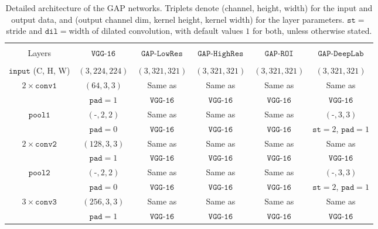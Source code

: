 \documentclass[british,10pt,twocolumn,letterpaper]{article}
\providecommand{\tabularnewline}{\\}
\begin{document}
\newpage





\begin{table*}
\caption{\label{tab:GAP-networks}Detailed architecture of the GAP networks.
Triplets denote (channel, height, width) for the input and output
data, and (output channel dim, kernel height, kernel width) for the
layer parameters. $\mathtt{st}=$stride and $\mathtt{dil}=$width
of dilated convolution, with default values $1$ for both, unless
otherwise stated.}

\begin{centering}
\begin{tabular}{cccccc}
 &  &  &  &  & \tabularnewline
Layers & $\mathtt{VGG}\text{-}\mathtt{16}$ & $\mathtt{GAP}\text{-}\mathtt{LowRes}$ &  $\mathtt{GAP}\text{-}\mathtt{HighRes}$ &  $\mathtt{GAP}\text{-}\mathtt{ROI}$ &  $\mathtt{GAP}\text{-}\mathtt{DeepLab}$\tabularnewline
 & \cite{Simonyan2015Iclr} &  \cite{zhou2015cnnlocalization} & \cite{kolesnikov2016seed} &  & \cite{Chen2016ArxivDeeplabv2}\tabularnewline
\hline 
$\mathtt{input}$ (C, H, W) & $(3,224,224)$ & $(3,321,321)$ & $(3,321,321)$ & $(3,321,321)$ & $(3,321,321)$\tabularnewline
\hline 
$2\times\mathtt{conv1}$ & $(64,3,3)$ & Same as & Same as & Same as & Same as\tabularnewline
 & $\mathtt{pad}=1$ & $\mathtt{VGG}\text{-}\mathtt{16}$ & $\mathtt{VGG}\text{-}\mathtt{16}$ & $\mathtt{VGG}\text{-}\mathtt{16}$ & $\mathtt{VGG}\text{-}\mathtt{16}$\tabularnewline
\hline 
$\mathtt{pool1}$ & $(\text{-},2,2)$ & Same as & Same as & Same as & $(\text{-},3,3)$\tabularnewline
 & $\mathtt{pad}=0$ & $\mathtt{VGG}\text{-}\mathtt{16}$ & $\mathtt{VGG}\text{-}\mathtt{16}$ & $\mathtt{VGG}\text{-}\mathtt{16}$ & $\mathtt{st}=2$, $\mathtt{pad}=1$\tabularnewline
\hline 
$2\times\mathtt{conv2}$ & $(128,3,3)$ & Same as & Same as & Same as & Same as\tabularnewline
 & $\mathtt{pad}=1$ & $\mathtt{VGG}\text{-}\mathtt{16}$ & $\mathtt{VGG}\text{-}\mathtt{16}$ & $\mathtt{VGG}\text{-}\mathtt{16}$ & $\mathtt{VGG}\text{-}\mathtt{16}$\tabularnewline
\hline 
$\mathtt{pool2}$ & $(\text{-},2,2)$ & Same as & Same as & Same as & $(\text{-},3,3)$\tabularnewline
 & $\mathtt{pad}=0$ & $\mathtt{VGG}\text{-}\mathtt{16}$ & $\mathtt{VGG}\text{-}\mathtt{16}$ & $\mathtt{VGG}\text{-}\mathtt{16}$ & $\mathtt{st}=2$, $\mathtt{pad}=1$\tabularnewline
\hline 
$3\times\mathtt{conv3}$ & $(256,3,3)$ & Same as & Same as & Same as & Same as\tabularnewline
 & $\mathtt{pad}=1$ & $\mathtt{VGG}\text{-}\mathtt{16}$ & $\mathtt{VGG}\text{-}\mathtt{16}$ & $\mathtt{VGG}\text{-}\mathtt{16}$ & $\mathtt{VGG}\text{-}\mathtt{16}$\tabularnewline

\end{tabular}
\end{centering}
\end{table*}
\end{document}
